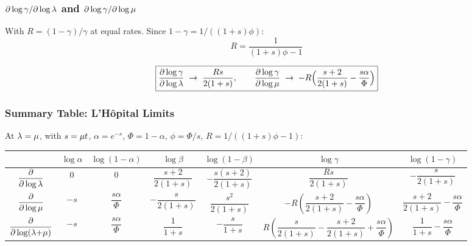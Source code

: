 \subsubsection{\texorpdfstring{$\partial\log\gamma/\partial\log\lambda$ and
$\partial\log\gamma/\partial\log\mu$}{partial log gamma / partial log lambda and partial log gamma / partial log mu}}

With $R = (1{-}\gamma)/\gamma$ at equal rates.
Since $1-\gamma = 1/((1{+}s)\phi)$:
\[
R = \frac{1}{(1+s)\phi - 1}
\]

\begin{equation}
\boxed{
\frac{\partial\log\gamma}{\partial\log\lambda}
  \;\to\; \frac{Rs}{2(1+s)},
\qquad
\frac{\partial\log\gamma}{\partial\log\mu}
  \;\to\; -R\Bigl(\frac{s+2}{2(1+s)} - \frac{s\alpha}{\Phi}\Bigr)}
\label{eq:loggamma-elasticity-limit}
\end{equation}


\subsubsection{Summary Table: L'H\^opital Limits}
\label{sec:score-table-limits}

At $\lambda = \mu$, with $s = \mu t$,
$\alpha = e^{-s}$, $\Phi = 1-\alpha$,
$\phi = \Phi/s$, $R = 1/((1{+}s)\phi - 1)$:

\begin{center}
\renewcommand{\arraystretch}{1.8}
\begin{tabular}{c|cccccc}
& $\log\alpha$ & $\log(1{-}\alpha)$
& $\log\beta$ & $\log(1{-}\beta)$
& $\log\gamma$ & $\log(1{-}\gamma)$ \\
\hline
$\dfrac{\partial}{\partial\log\lambda}$
  & $0$
  & $0$
  & $\dfrac{s+2}{2(1+s)}$
  & $-\dfrac{s(s+2)}{2(1+s)}$
  & $\dfrac{Rs}{2(1+s)}$
  & $-\dfrac{s}{2(1+s)}$
\\[8pt]
$\dfrac{\partial}{\partial\log\mu}$
  & $-s$
  & $\dfrac{s\alpha}{\Phi}$
  & $-\dfrac{s}{2(1+s)}$
  & $\dfrac{s^2}{2(1+s)}$
  & $-R\!\left(\dfrac{s{+}2}{2(1{+}s)}{-}\dfrac{s\alpha}{\Phi}\right)$
  & $\dfrac{s+2}{2(1+s)}{-}\dfrac{s\alpha}{\Phi}$
\\[8pt]
$\dfrac{\partial}{\partial\log(\lambda{+}\mu)}$
  & $-s$
  & $\dfrac{s\alpha}{\Phi}$
  & $\dfrac{1}{1+s}$
  & $-\dfrac{s}{1+s}$
  & $R\!\left(\dfrac{s}{2(1{+}s)}{-}\dfrac{s{+}2}{2(1{+}s)}{+}\dfrac{s\alpha}{\Phi}\right)$
  & $\dfrac{1}{1+s}{-}\dfrac{s\alpha}{\Phi}$
\end{tabular}
\end{center}

